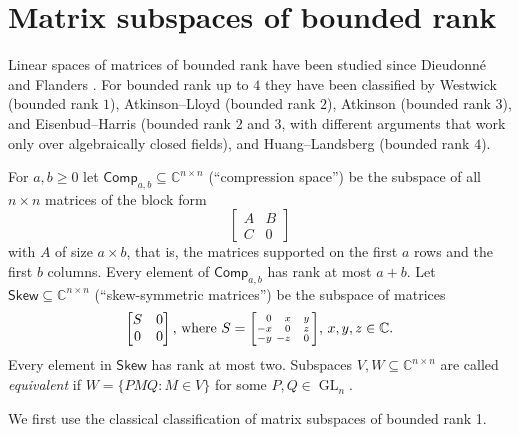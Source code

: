 \documentclass[11pt,a4paper]{article}
\numberwithin{equation}{section}
\newcommand{\CC}{\mathbb{C}}
\DeclareMathOperator{\GL}{GL}
\newcommand{\Comp}{\mathsf{Comp}}
\newcommand{\Alt}{\mathsf{Skew}}
\begin{document}
\section{Matrix subspaces of bounded rank}\label{sec:matrix-subspaces}

Linear spaces of matrices of bounded rank have been studied since Dieudonn\'e \cite{MR29360} and Flanders \cite{MR136618}. For bounded rank up to $4$ they have been classified by Westwick \cite{MR296081} (bounded rank $1$), Atkinson--Lloyd \cite{MR587090, MR621563} (bounded rank $2$), Atkinson \cite{MR695915} (bounded rank $3$), and Eisenbud--Harris \cite{MR954659} (bounded rank $2$ and $3$, with different arguments that work only over algebraically closed fields), and Huang--Landsberg \cite{MR5044121} (bounded rank $4$).

%

For $a,b \geq 0$ let $\Comp_{a,b} \subseteq \CC^{n \times n}$ (``compression space'') be the subspace of all $n \times n$ matrices of the block form
\[
\begin{bmatrix} A & B \\ C & 0 \end{bmatrix}
\]
with $A$ of size $a \times b$, that is, the matrices supported on the first $a$ rows and the first $b$ columns. %
%
%
Every element of $\Comp_{a,b}$ has rank at most $a+b$. Let $\Alt \subseteq \CC^{n\times n}$ (``skew-symmetric matrices'') be the subspace of  matrices
\[
\begin{bmatrix} S & 0 \\ 0 & 0 \end{bmatrix},\, \textnormal{where }  
S = \begin{bsmallmatrix} \!\phantom{-}0 & \phantom{-}x & \phantom{-}y \\ \!-x & \phantom{-}0 & \phantom{-}z \\ \!-y & -z & \phantom{-}0 \end{bsmallmatrix},\, x,y,z \in \CC.
\]
Every element in $\Alt$ has rank at most two.
Subspaces $V, W \subseteq \CC^{n\times n}$ are called \emph{equivalent} if $W = \{PMQ : M \in V\}$ for some $P,Q \in \GL_n$.

We first use the classical classification of matrix subspaces of bounded rank 1.
\end{document}
